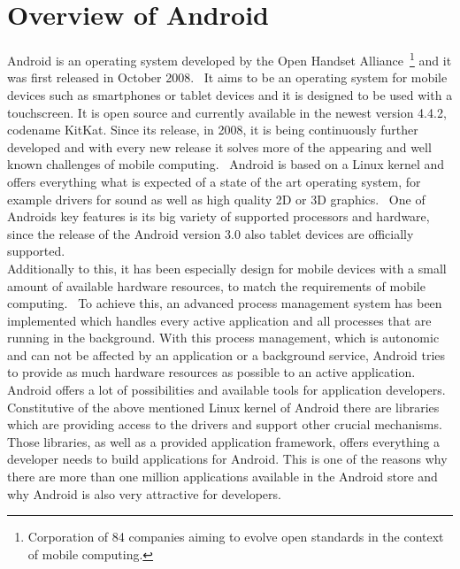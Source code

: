\section{Overview of Android}
\label{sec:overview:overview-of-android}
Android is an operating system developed by the Open Handset Alliance~\footnote{Corporation of 84 companies aiming to evolve open standards in the context of mobile computing.} and it was first released in October 2008.~\cite{developers2011android}
It aims to be an operating system for mobile devices such as smartphones or tablet devices and it is designed to be used with a touchscreen.
It is open source and currently available in the newest version 4.4.2, codename KitKat.
Since its release, in 2008, it is being continuously further developed and with every new release it solves more of the appearing and well known challenges of mobile computing.~\cite{forman1994challenges}
Android is based on a Linux kernel and offers everything what is expected of a state of the art operating system, for example drivers for sound as well as high quality 2D or 3D graphics.~\cite{burnette2009hello}
One of Androids key features is its big variety of supported processors and hardware, since the release of the Android version 3.0 also tablet devices are officially supported.\\
Additionally to this, it has been especially design for mobile devices with a small amount of available hardware resources, to match the requirements of mobile computing.~\cite{nosrati2012mobile}
To achieve this, an advanced process management system has been implemented which handles every active application and all processes that are running in the background.
With this process management, which is autonomic and can not be affected by an application or a background service, Android tries to provide as much hardware resources as possible to an active application.\\
Android offers a lot of possibilities and available tools for application developers.
Constitutive of the above mentioned Linux kernel of Android there are libraries which are providing access to the drivers and support other crucial mechanisms. 
Those libraries, as well as a provided application framework, offers everything a developer needs to build applications for Android.
This is one of the reasons why there are more than one million applications available in the Android store and why Android is also very attractive for developers.\\

